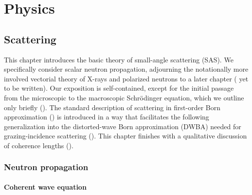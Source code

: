 
\part{Physics}\label{PPHYS}

\chapter{Scattering}  \label{SSca}

%

This chapter introduces the basic theory of small-angle scattering (SAS).
We specifically consider scalar neutron propagation,
adjourning the notationally more involved
vectorial theory of X-rays and polarized neutrons
to a later chapter (%
yet to be written). %
Our exposition is self-contained,
except for the initial passage from the microscopic
to the macroscopic Schrödinger equation,
which we outline only briefly ().
The standard description of scattering in first-order Born approximation
()
is introduced in a way that facilitates the following generalization
into the distorted-wave Born approximation (DWBA)
needed for grazing-incidence scattering ().
This chapter finishes with a qualitative discussion
of coherence lengths ().

\section{Neutron propagation}\label{Swave}
%
%

\subsection{Coherent wave equation}

